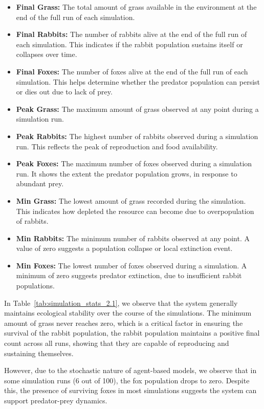 \begin{itemize}
    \item \textbf{Final Grass:} The total amount of grass available in the environment at the end of the full run of each simulation.
    
    \item \textbf{Final Rabbits:} The number of rabbits alive at the end of the full run of each simulation. This indicates if the rabbit population sustains itself or collapses over time.
    
    \item \textbf{Final Foxes:} The number of foxes alive at the end of the full run of each simulation. This helps determine whether the predator population can persist or dies out due to lack of prey.
    
    \item \textbf{Peak Grass:} The maximum amount of grass observed at any point during a simulation run.
    
    \item \textbf{Peak Rabbits:} The highest number of rabbits observed during a simulation run. This reflects the peak of reproduction and food availability.
    
    \item \textbf{Peak Foxes:} The maximum number of foxes observed during a simulation run. It shows the extent the predator population grows, in response to abundant prey.
    
    \item \textbf{Min Grass:} The lowest amount of grass recorded during the simulation. This indicates how depleted the resource can become due to overpopulation of rabbits.
    
    \item \textbf{Min Rabbits:} The minimum number of rabbits observed at any point. A value of zero suggests a population collapse or local extinction event.
    
    \item \textbf{Min Foxes:} The lowest number of foxes observed during a simulation. A minimum of zero suggests predator extinction, due to insufficient rabbit populations.
\end{itemize}

In Table~\ref{tab:simulation_stats_2.1}, we observe that the system generally maintains ecological stability over the course of the simulations. The minimum amount of grass never reaches zero, which is a critical factor in ensuring the survival of the rabbit population, the rabbit population maintains a positive final count across all runs, showing that they are capable of reproducing and sustaining themselves.

However, due to the stochastic nature of agent-based models, we observe that in some simulation runs (6 out of 100), the fox population drops to zero. Despite this, the presence of surviving foxes in most simulations suggests the system can support predator-prey dynamics.
